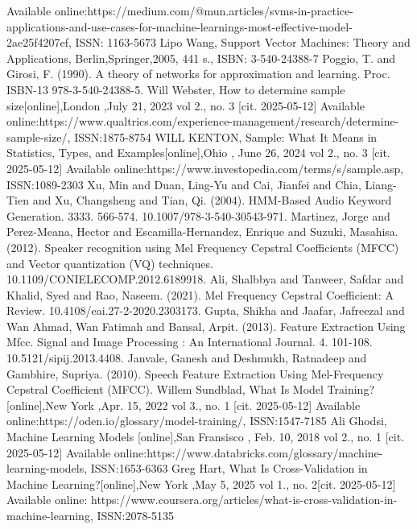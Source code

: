 \documentclass[english,12pt,oneside,a4paper]{article}
\begin{document}
\begin{thebibliography}{15}
		Available online:https://medium.com/@mun.articles/svms-in-practice-applications-and-use-cases-for-machine-learnings-most-effective-model-2ae25f4207ef, ISSN: 1163-5673
		Lipo Wang, Support Vector Machines: Theory and Applications, Berlin,Springer,2005, 441 s., ISBN: 3-540-24388-7
		Poggio, T. and Girosi, F. (1990). A theory of networks for approximation and
		learning. Proc. ISBN-13 978-3-540-24388-5.
		Will Webster, How to determine sample size[online],London ,July 21, 2023 vol 2., no. 3 [cit. 2025-05-12]  
		Available online:https://www.qualtrics.com/experience-management/research/determine-sample-size/, ISSN:1875-8754
		WILL KENTON, Sample: What It Means in Statistics, Types, and Examples[online],Ohio , June 26, 2024 vol 2., no. 3 [cit. 2025-05-12]
		Available online:https://www.investopedia.com/terms/s/sample.asp, ISSN:1089-2303
		Xu, Min and Duan, Ling-Yu and Cai, Jianfei and Chia, Liang-Tien and Xu, Changsheng and Tian, Qi. (2004). HMM-Based Audio Keyword Generation. 3333. 566-574. 10.1007/978-3-540-30543-971.
		Martinez, Jorge and Perez-Meana, Hector and Escamilla-Hernandez, Enrique and Suzuki, Masahisa. (2012). Speaker recognition using Mel Frequency Cepstral Coefficients (MFCC) and Vector quantization (VQ) techniques. 10.1109/CONIELECOMP.2012.6189918. 
		Ali, Shalbbya and Tanweer, Safdar and Khalid, Syed and Rao, Naseem. (2021). Mel Frequency Cepstral Coefficient: A Review. 10.4108/eai.27-2-2020.2303173. 
		Gupta, Shikha and Jaafar, Jafreezal and Wan Ahmad, Wan Fatimah and Bansal, Arpit. (2013). Feature Extraction Using Mfcc. Signal and Image Processing : An International Journal. 4. 101-108. 10.5121/sipij.2013.4408. 
		Janvale, Ganesh and Deshmukh, Ratnadeep and Gambhire, Supriya. (2010). Speech Feature Extraction Using Mel-Frequency Cepstral Coefficient (MFCC). 
		Willem Sundblad, What Is Model Training?[online],New York ,Apr. 15, 2022 vol 3., no. 1 [cit. 2025-05-12]
		Available online:https://oden.io/glossary/model-training/, ISSN:1547-7185
		Ali Ghodsi, Machine Learning Models [online],San Fransisco , Feb. 10, 2018 vol 2., no. 1 [cit. 2025-05-12]
		Available online:https://www.databricks.com/glossary/machine-learning-models, ISSN:1653-6363
		Greg Hart, What Is Cross-Validation in Machine Learning?[online],New York ,May 5, 2025 vol 1., no. 2[cit. 2025-05-12]
		Available online: https://www.coursera.org/articles/what-is-cross-validation-in-machine-learning, ISSN:2078-5135

\end{thebibliography}
\end{document}
